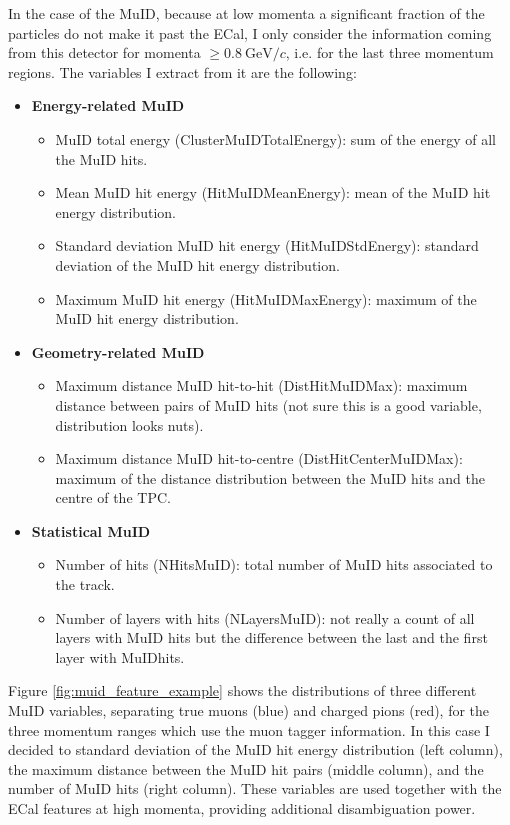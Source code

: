 In the case of the MuID, because at low momenta a significant fraction of the particles do not make it past the ECal, I only consider the information coming from this detector for momenta $\geq 0.8~\mathrm{GeV}/c$, i.e. for the last three momentum regions. The variables I extract from it are the following:
\begin{itemize}
	\item \textbf{Energy-related MuID}
	\begin{itemize}
		\item MuID total energy (ClusterMuIDTotalEnergy): sum of the energy of all the MuID hits.
		\item Mean MuID hit energy (HitMuIDMeanEnergy): mean of the MuID hit energy distribution.
		\item Standard deviation MuID hit energy (HitMuIDStdEnergy): standard deviation of the MuID hit energy distribution.
		\item Maximum MuID hit energy (HitMuIDMaxEnergy): maximum of the MuID hit energy distribution.
	\end{itemize}
	\item \textbf{Geometry-related MuID}
	\begin{itemize}
		\item Maximum distance MuID hit-to-hit (DistHitMuIDMax): maximum distance between pairs of MuID hits (not sure this is a good variable, distribution looks nuts).
		\item Maximum distance MuID hit-to-centre (DistHitCenterMuIDMax): maximum of the distance distribution between the MuID hits and the centre of the TPC.
	\end{itemize}
	\item \textbf{Statistical MuID}
	\begin{itemize}
		\item Number of hits (NHitsMuID): total number of MuID hits associated to the track.
		\item Number of layers with hits (NLayersMuID): not really a count of all layers with MuID hits but the difference between the last and the first layer with MuIDhits.
	\end{itemize}
\end{itemize}

Figure \ref{fig:muid_feature_example} shows the distributions of three different MuID variables, separating true muons (blue) and charged pions (red), for the three momentum ranges which use the muon tagger information. In this case I decided to  standard deviation of the MuID hit energy distribution (left column), the maximum distance between the MuID hit pairs (middle column), and the number of MuID hits (right column). These variables are used together with the ECal features at high momenta, providing additional disambiguation power.

